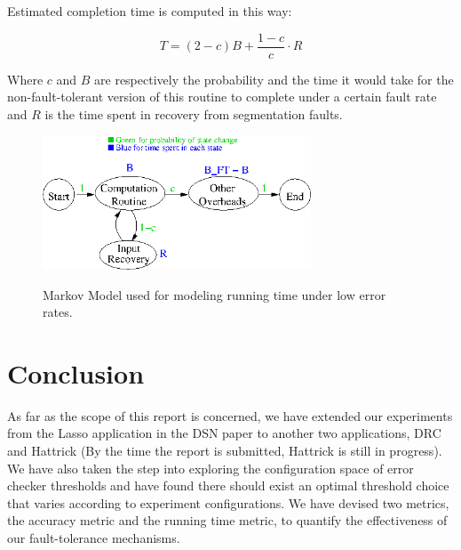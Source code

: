 \documentclass{article}
\begin{document}
Estimated completion time is computed in this way:

\[
T=(2-c) B + \frac{1-c}{c} \cdot R
\]

Where $c$ and $B$ are respectively the probability and the time it would take for the non-fault-tolerant version of this routine to complete under a certain fault rate and $R$ is the time spent in recovery from segmentation faults.

\begin{figure}
\includegraphics[width=8cm]{model1.png}
\label{markovModel}
\caption{Markov Model used for modeling running time under low error rates.}
\end{figure}

\section{Conclusion}

As far as the scope of this report is concerned, we have extended our experiments from the Lasso application in the DSN paper to another two applications, DRC and Hattrick (By the time the report is submitted, Hattrick is still in progress). We have also taken the step into exploring the configuration space of error checker thresholds and have found there should exist an optimal threshold choice that varies according to experiment configurations. We have devised two metrics, the accuracy metric and the running time metric, to quantify the effectiveness of our fault-tolerance mechanisms.


\nocite{5764677}
\nocite{Rinard:2006:PAB:1183401.1183447}
\nocite{deKruijf:2010:RAF:1816038.1816026}
\nocite{deKruijf:2010:RAF:1815961.1816026}
\nocite{Riesen:2011:SAR:2238436.2238466}
\nocite{1386657}
\nocite{journals/ijhpca/CappelloGGKKS09}
\nocite{Restrepo-Calle:2010:CIF:1811212.1811218}
\nocite{6264672}
\nocite{deKruijf:2011:IPA:2155620.2155637}
\nocite{Baek10green:a}
\nocite{Hoffmann:2011:DKR:1961295.1950390}
\nocite{Chan:2009:AMP:1654059.1654065}
\nocite{Cui:2012:EPO:2355585.2355587}
\nocite{1402092}
\nocite{deKruijf:2012:SAC:2345156.2254120}
\nocite{Abadi:2009:CIP:1609956.1609960}
\nocite{Reis:2005:SFT:1113841.1113843}
\nocite{lee2011sef}
\nocite{6012845}
\end{document}
